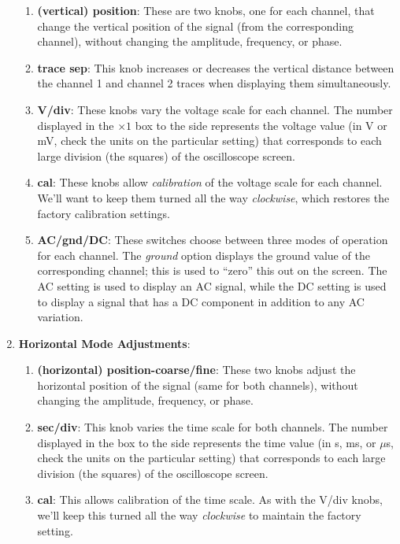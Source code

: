 \begin{enumerate}
\begin{enumerate}
	\item {\bf (vertical) position}: These are two knobs, one for 
each channel, that change the vertical position of the signal (from the 
corresponding channel), without changing the amplitude, frequency, or phase.
 
	\item {\bf trace sep}: This knob increases or decreases the vertical 
distance between the channel 1 and channel 2 traces when displaying them 
simultaneously.

	\item {\bf V/div}:  These knobs vary the voltage scale for each 
channel.  The number displayed in the $\times 1$ box to the side represents the
voltage value (in V or mV, check the units on the particular setting) that
corresponds to each large division (the squares) of the oscilloscope screen.
  
	\item {\bf cal}: These knobs allow {\it calibration} of the voltage
scale for each channel.  We'll want to keep them turned all the way 
{\it clockwise}, which restores the factory calibration settings.

	\item {\bf AC/gnd/DC}: These switches choose between three modes of 
operation for each channel.  The {\it ground} option displays the ground value
of the corresponding channel; this is used to ``zero'' this out on the screen.
The AC setting is used to display an AC signal, while the DC setting is used 
to display a signal that has a DC component in addition to any AC variation. 
 	\end{enumerate}

\item {\bf Horizontal Mode Adjustments}:
	\begin{enumerate}
	\item {\bf (horizontal) position-coarse/fine}: These two knobs adjust
the horizontal position of the signal (same for both channels), without 
changing the amplitude, frequency, or phase.

	\item {\bf sec/div}: This knob varies the time scale for both channels.
The number displayed in the box to the side represents the time value (in s, 
ms, or $\mu$s, check the units on the particular setting) that corresponds to 
each large division (the squares) of the oscilloscope screen.
  
	\item {\bf cal}: This allows calibration of the time scale.  As with 
the V/div knobs, we'll keep this turned all the way {\it clockwise} to maintain
the factory setting.


\end{enumerate}
\end{enumerate}
